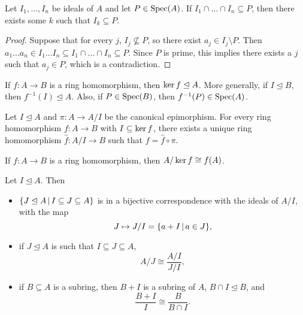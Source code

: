 \begin{lemma}
  Let $I_1, \ldots, I_n$ be ideals of $A$ and let $P \in \operatorname{Spec}(A)$.
  If $I_1 \cap \ldots \cap I_n \subseteq P$, then there exists some $k$ such
  that $I_k \subseteq P$.
\end{lemma}

\begin{proof}
  Suppose that for every $j$, $I_j \nsubseteq P$, so there exist $a_j \in I_j
  \setminus P$.
  Then $a_1 \ldots a_n \in I_1 \ldots I_n \subseteq I_1 \cap \ldots \cap I_n
  \subseteq P$.
  Since $P$ is prime, this implies there exists a $j$ such that $a_j \in P$,
  which is a contradiction.
\end{proof}

\begin{remark}
  If $f: A \to B$ is a ring homomorphism, then $\operatorname{ker} f \trianglelefteq A$.
  More generally, if $I \trianglelefteq B$, then $f^{-1}(I) \trianglelefteq A$.
  Also, if $P \in \operatorname{Spec}(B)$, then $f^{-1}(P) \in \operatorname{Spec}(A)$.
\end{remark}

\begin{proposition}
  Let $I \trianglelefteq A$ and $\pi : A \to A/I$ be the canonical epimorphism.
  For every ring homomorphism $f: A \to B$ with $I \subseteq \operatorname{ker} f$, there
  exists a unique ring homomorphism $\hat{f}: A/I \to B$ such that $f = \hat{f}
  \circ \pi$.
\end{proposition}

\begin{corollary}
  If $f: A \to B$ is a ring homomorphism, then $A / \operatorname{ker} f \cong f(A)$.
\end{corollary}

\begin{theorem}
  Let $I \trianglelefteq A$.
  Then
  \begin{itemize}
  \item $\{ J \trianglelefteq A \,|\, I \subseteq J \subseteq A \}$ is in a
	bijective correspondence with the ideals of $A/I$, with the map
	\[
	  J \mapsto J/I = \{ a + I \,|\, a \in J \},
	\]
  \item if $J \trianglelefteq A$ is such that $I \subseteq J \subseteq A$,
	\[
	  A/J \cong \frac{A/I}{J/I},
	\]
  \item if $B \subseteq A$ is a subring, then $B+I$ is a subring of $A$, $B \cap
	I \trianglelefteq B$, and
	\[
	  \frac{B+I}{I} \cong \frac{B}{B \cap I}.
	\]
  \end{itemize}
\end{theorem}

